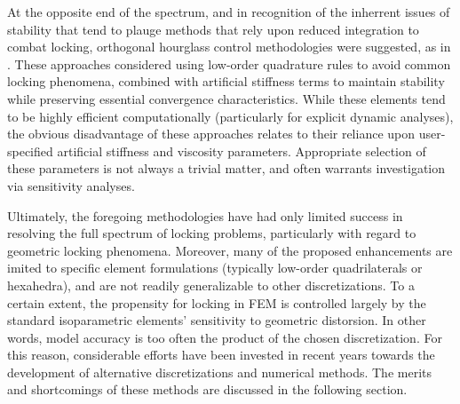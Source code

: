 		At the opposite end of the spectrum, and in recognition of the inherrent issues of stability that tend to plauge methods that rely upon reduced integration to combat locking, orthogonal hourglass control methodologies were suggested, as in \cite{Flanagan:81}. These approaches considered using low-order quadrature rules to avoid common locking phenomena, combined with artificial stiffness terms to maintain stability while preserving essential convergence characteristics. While these elements tend to be highly efficient computationally (particularly for explicit dynamic analyses), the obvious disadvantage of these approaches relates to their reliance upon user-specified artificial stiffness and viscosity parameters. Appropriate selection of these parameters is not always a trivial matter, and often warrants investigation via sensitivity analyses.
			
		Ultimately, the foregoing methodologies have had only limited success in resolving the full spectrum of locking problems, particularly with regard to geometric locking phenomena. Moreover, many of the proposed enhancements are imited to specific element formulations (typically low-order quadrilaterals or hexahedra), and are not readily generalizable to other discretizations. To a certain extent, the propensity for locking in FEM is controlled largely by the standard isoparametric elements' sensitivity to geometric distorsion. In other words, model accuracy is too often the product of the chosen discretization. For this reason, considerable efforts have been invested in recent years towards the development of alternative discretizations and numerical methods. The merits and shortcomings of these methods are discussed in the following section.
	
